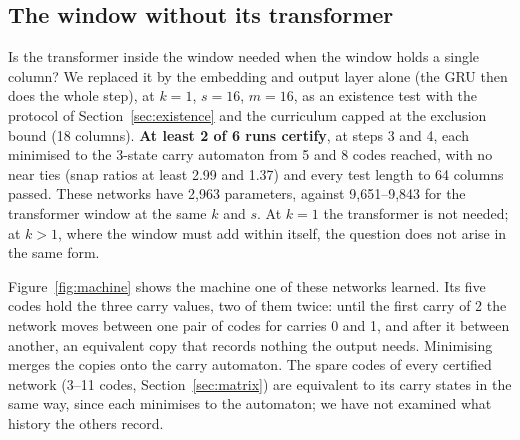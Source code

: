 \documentclass[11pt]{article}
\begin{document}
\subsection{The window without its transformer}
\label{sec:e6}

Is the transformer inside the window needed when the window holds a single column? We replaced it by
the embedding and output layer alone (the GRU then does the whole step), at $k = 1$, $s = 16$,
$m = 16$, as an existence test with the protocol of Section~\ref{sec:existence} and the curriculum
capped at the exclusion bound (18 columns). \textbf{At least 2 of 6 runs certify}, at steps 3 and 4,
each minimised to the 3-state carry automaton from 5 and 8 codes reached, with no near ties (snap
ratios at least 2.99 and 1.37) and every test length to 64 columns passed. These networks have
2{,}963 parameters, against 9{,}651--9{,}843 for the transformer window at the same $k$ and $s$. At
$k = 1$ the transformer is not needed; at $k > 1$, where the window must add within itself, the
question does not arise in the same form.

Figure~\ref{fig:machine} shows the machine one of these networks learned. Its five codes hold the
three carry values, two of them twice: until the first carry of 2 the network moves between one
pair of codes for carries 0 and 1, and after it between another, an equivalent copy that records
nothing the output needs. Minimising merges the copies onto the carry automaton. The spare codes of
every certified network (3--11 codes, Section~\ref{sec:matrix}) are equivalent to its carry states
in the same way, since each minimises to the automaton; we have not examined what history the
others record.
\end{document}

